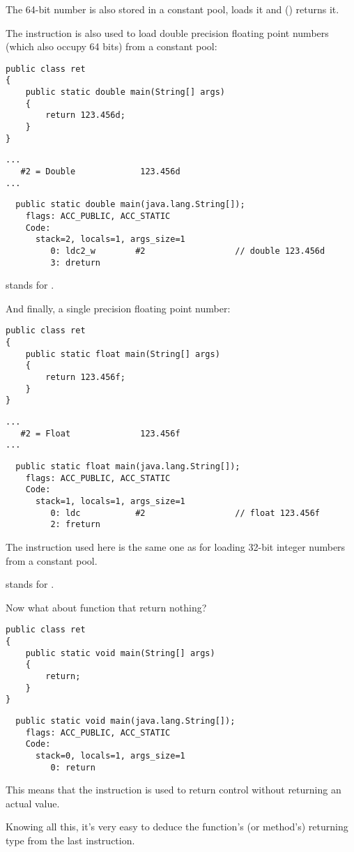 The 64-bit number is also stored in a constant pool,  loads it and  
() returns it.

The  instruction is also used to load double precision floating point numbers 
(which also occupy 64 bits) from a constant pool:

\begin{lstlisting}
public class ret
{
	public static double main(String[] args)
	{
		return 123.456d;
	}
}
\end{lstlisting}

\begin{lstlisting}[caption=Constant pool]
...
   #2 = Double             123.456d
...
\end{lstlisting}

\begin{lstlisting}
  public static double main(java.lang.String[]);
    flags: ACC_PUBLIC, ACC_STATIC
    Code:
      stack=2, locals=1, args_size=1
         0: ldc2_w        #2                  // double 123.456d
         3: dreturn       
\end{lstlisting}

 stands for .

And finally, a single precision floating point number:

\begin{lstlisting}
public class ret
{
	public static float main(String[] args)
	{
		return 123.456f;
	}
}
\end{lstlisting}

\begin{lstlisting}[caption=Constant pool]
...
   #2 = Float              123.456f
...
\end{lstlisting}

\begin{lstlisting}
  public static float main(java.lang.String[]);
    flags: ACC_PUBLIC, ACC_STATIC
    Code:
      stack=1, locals=1, args_size=1
         0: ldc           #2                  // float 123.456f
         2: freturn       
\end{lstlisting}

The  instruction used here is the same one as for loading 32-bit integer numbers
from a constant pool.

 stands for .

Now what about function that return nothing?

\begin{lstlisting}
public class ret
{
	public static void main(String[] args) 
	{
		return;
	}
}
\end{lstlisting}

\begin{lstlisting}
  public static void main(java.lang.String[]);
    flags: ACC_PUBLIC, ACC_STATIC
    Code:
      stack=0, locals=1, args_size=1
         0: return        
\end{lstlisting}

This means that the  instruction is used to return control without returning 
an actual value.

Knowing all this, it's very easy to deduce the function's (or method's) returning type 
from the last instruction.

